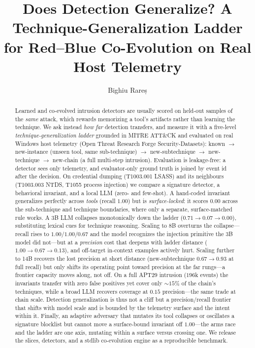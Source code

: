 \documentclass[sigconf,nonacm]{acmart}
\begin{document}
\title{Does Detection Generalize? A Technique-Generalization Ladder for
Red--Blue Co-Evolution on Real Host Telemetry}

\author{Bighiu Rareș}

\begin{abstract}
Learned and co-evolved intrusion detectors are usually scored on held-out
samples of the \emph{same} attack, which rewards memorizing a tool's artifacts
rather than learning the technique. We ask instead \emph{how far} detection
transfers, and measure it with a five-level \emph{technique-generalization
ladder} grounded in MITRE ATT\&CK and evaluated on real Windows host telemetry
(Open Threat Research Forge Security-Datasets): known $\rightarrow$ new-instance
(unseen tool, same sub-technique) $\rightarrow$ new-subtechnique $\rightarrow$
new-technique $\rightarrow$ new-chain (a full multi-step intrusion). Evaluation
is leakage-free: a detector sees only telemetry, and
evaluator-only ground truth is joined by event id after the decision. On
credential dumping (T1003.001 LSASS) and its neighbours (T1003.003 NTDS, T1055
process injection) we compare a signature detector, a behavioral invariant, and
a local LLM (zero- and few-shot). A hand-coded invariant generalizes perfectly
across \emph{tools} (recall $1.00$) but is \emph{surface-locked}: it scores
$0.00$ across the sub-technique and technique boundaries, where only a separate,
surface-matched rule works. A 3B LLM collapses monotonically down the ladder
($0.71\!\rightarrow\!0.07\!\rightarrow\!0.00$), substituting lexical cues for
technique reasoning. Scaling to 8B overturns the collapse---recall rises to
$1.00/1.00/0.67$ and the model recognizes the injection primitive the 3B model
did not---but at a \emph{precision} cost that deepens with ladder distance
($1.00\!\rightarrow\!0.67\!\rightarrow\!0.13$), and off-target in-context
examples actively hurt. Scaling further to 14B recovers the lost precision at
short distance (new-subtechnique $0.67\!\rightarrow\!0.93$ at full recall) but
only shifts its operating point toward precision at the far rungs---a frontier
capacity moves along, not off. On a full APT29 intrusion ($196$k events) the invariants
transfer with zero false positives yet cover only $\sim\!15\%$ of the chain's
techniques, while a broad LLM recovers coverage at $0.15$ precision---the same
trade at chain scale. Detection generalization is thus not a cliff but a
precision/recall frontier that shifts with model scale and is bounded by the
telemetry surface and the intent within it. Finally, an adaptive adversary that
mutates its tool collapses or oscillates a signature blocklist but cannot move a
surface-bound invariant off $1.00$---the arms race and the ladder are one axis,
mutating within a surface versus crossing one. We release the slices, detectors,
and a stdlib co-evolution engine as a reproducible benchmark.
\end{abstract}
\end{document}
